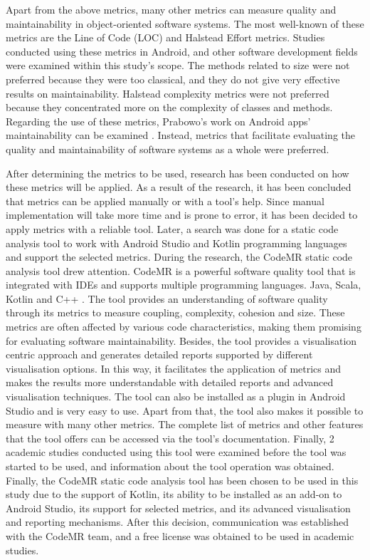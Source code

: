 Apart from the above metrics, many other metrics can measure quality and maintainability in object-oriented software systems. The most well-known of these metrics are the Line of Code (LOC) and Halstead Effort metrics. Studies conducted using these metrics in Android, and other software development fields were examined within this study's scope. The methods related to size were not preferred because they were too classical, and they do not give very effective results on maintainability. Halstead complexity metrics were not preferred because they concentrated more on the complexity of classes and methods. Regarding the use of these metrics, Prabowo's work on Android apps' maintainability can be examined \cite{19}. Instead, metrics that facilitate evaluating the quality and maintainability of software systems as a whole were preferred.

After determining the metrics to be used, research has been conducted on how these metrics will be applied. As a result of the research, it has been concluded that metrics can be applied manually or with a tool's help. Since manual implementation will take more time and is prone to error, it has been decided to apply metrics with a reliable tool. Later, a search was done for a static code analysis tool to work with Android Studio and Kotlin programming languages and support the selected metrics. During the research, the CodeMR static code analysis tool drew attention. CodeMR is a powerful software quality tool that is integrated with IDEs and supports multiple programming languages. Java, Scala, Kotlin and C++ \cite{37}. The tool provides an understanding of software quality through its metrics to measure coupling, complexity, cohesion and size. These metrics are often affected by various code characteristics, making them promising for evaluating software maintainability.  Besides, the tool provides a visualisation centric approach and generates detailed reports supported by different visualisation options. In this way, it facilitates the application of metrics and makes the results more understandable with detailed reports and advanced visualisation techniques. The tool can also be installed as a plugin in Android Studio and is very easy to use. Apart from that, the tool also makes it possible to measure with many other metrics. The complete list of metrics and other features that the tool offers can be accessed via the tool's documentation. Finally, 2 academic studies conducted using this tool were examined before the tool was started to be used, and information about the tool operation was obtained\cite{38}\cite{39}. Finally, the CodeMR static code analysis tool has been chosen to be used in this study due to the support of Kotlin, its ability to be installed as an add-on to Android Studio, its support for selected metrics, and its advanced visualisation and reporting mechanisms. After this decision, communication was established with the CodeMR team, and a free license was obtained to be used in academic studies. 

